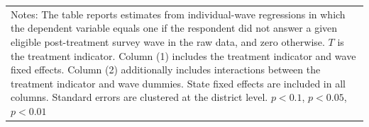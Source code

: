 {{\begin{tabular}{l*{2}{c}}
\hline\hline
\multicolumn{3}{p{.75\linewidth}}{\scriptsize Notes: The table reports estimates from individual-wave regressions in which the dependent variable equals one if the respondent did not answer a given eligible post-treatment survey wave in the raw data, and zero otherwise. \(T\) is the treatment indicator.  Column (1) includes the treatment indicator and wave fixed effects. Column (2) additionally includes interactions between the treatment indicator and wave dummies. State fixed effects are included in all columns. Standard errors are clustered at the district level. \sym{*} \(p<0.1\), \sym{**} \(p<0.05\), \sym{***} \(p<0.01\)}\\
\end{tabular}
}%

}
